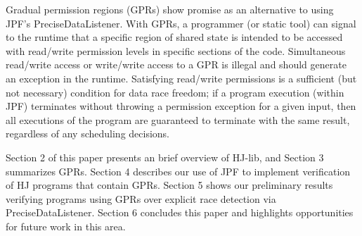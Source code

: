 Gradual permission regions (GPRs) \cite{Westbrook:2011:PRR:2341616.2341627,
Westbrook:2012:PPR:2367163.2367201} show promise as an alternative to using
JPF's PreciseDataListener. With GPRs, a programmer (or static tool) can signal
to the runtime that a specific region of shared state is intended to be
accessed with read/write permission levels in specific sections of the code.
Simultaneous read/write access or write/write access to a GPR is illegal and
should generate an exception in the runtime. Satisfying read/write permissions
is a sufficient (but not necessary) condition for data race freedom; if a
program execution (within JPF) terminates without throwing a permission
exception for a given input, then all executions of the program are guaranteed
to terminate with the same result, regardless of any scheduling decisions.

Section 2 of this paper presents an brief overview of HJ-lib, and Section 3
summarizes GPRs. Section 4 describes our use of JPF to implement
verification of HJ programs that contain GPRs. Section 5 shows our preliminary
results verifying programs using GPRs over explicit race detection via
PreciseDataListener. Section 6 concludes this paper and highlights opportunities
for future work in this area.
